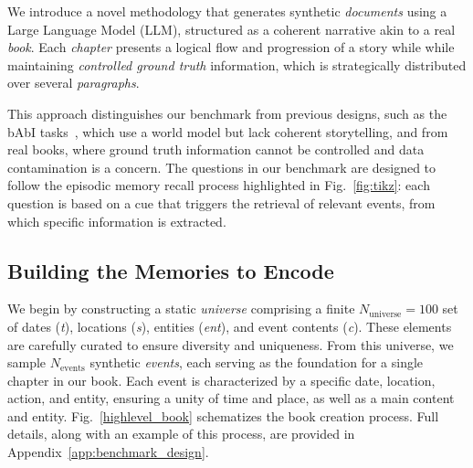 \documentclass{article}
\begin{document}


We introduce a novel methodology that generates synthetic \textit{documents} using a Large Language Model (LLM), structured as a coherent narrative akin to a real \textit{book}. Each \textit{chapter} presents a logical flow and progression of a story while while maintaining \textit{controlled ground truth} information, which is strategically distributed over several \textit{paragraphs}.

This approach distinguishes our benchmark from previous designs, such as the bAbI tasks~\citep{weston2015towards_babi}, which use a world model but lack coherent storytelling, and from real books, where ground truth information cannot be controlled and data contamination is a concern. The questions in our benchmark are designed to follow the episodic memory recall process highlighted in Fig.~\ref{fig:tikz}: each question is based on a cue that triggers the retrieval of relevant events, from which specific information is extracted.

\subsection{Building the Memories to Encode}

We begin by constructing a static \emph{universe} comprising a finite $N_{\text{universe}}=100$ set of dates (\emph{t}), locations (\emph{s}), entities (\emph{ent}), and event contents (\emph{c}). These elements are carefully curated to ensure diversity and uniqueness. From this universe, we sample $N_{\text{events}}$ synthetic \emph{events}, each serving as the foundation for a single chapter in our book. Each event is characterized by a specific date, location, action, and entity, ensuring a unity of time and place, as well as a main content and entity. Fig.~\ref{highlevel_book} schematizes the book creation process. Full details, along with an example of this process, are provided in Appendix~\ref{app:benchmark_design}.
\end{document}
